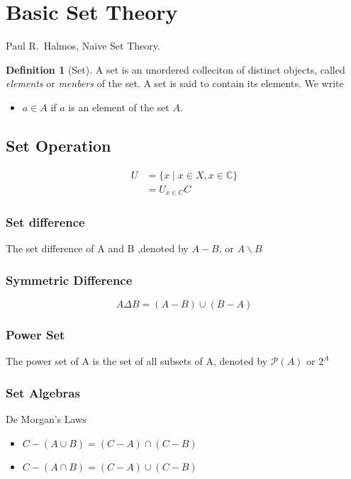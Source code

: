 \documentclass{article}
\theoremstyle{definition}
\newtheorem{definition}{Definition}[subsection]
\begin{document}
\section{Basic Set Theory}

Paul R.~Halmos, Naive Set Theory.
\begin{definition}[Set]
    A set is an unordered colleciton of distinct objects, called \emph{elements} or \emph{menbers} of the set. A set is said to contain its elements. We write
    \begin{itemize}
        \item $a \in A$ if $a$ is an element of the set $A$.
    \end{itemize}
\end{definition}
\subsection{Set Operation}
\begin{align*}
    U & = \{x \mid x \in X, x \in \mathbb{C} \} \\
      & = U_{x \in C}C
\end{align*}

\subsubsection{Set difference}
The set difference of A and B ,denoted by $A-B$, or $A \backslash B$
\subsubsection{Symmetric Difference}
\begin{equation}
    A \Delta B = (A-B)\cup(B-A)
\end{equation}

\subsubsection{Power Set}
The power set of A is the set of all subsets of A, denoted by $\mathcal{P}(A)$ or $2^A$

\subsubsection{Set Algebras}
De Morgan's Laws
\begin{itemize}
    \item $C - (A \cup B) = (C-A) \cap (C-B)$
    \item $C - (A \cap B) = (C-A) \cup (C-B) $
\end{itemize}
\end{document}
